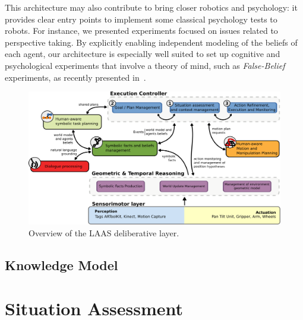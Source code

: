 \documentclass[letterpaper, 10 pt, conference]{ieeeconf}  %
\begin{document}
This architecture may also contribute to bring closer robotics and psychology:
it provides clear entry points to implement some classical psychology tests to
robots. For instance, we presented experiments focused on issues related to
perspective taking. By explicitly enabling independent modeling of the beliefs
of each agent, our architecture is especially well suited to set up cognitive
and psychological experiments that involve a theory of mind, such as
\emph{False-Belief} experiments, as recently presented in~\cite{Warnier2012a}.



\cite{Alami2011}

\begin{figure}
        \centering
        \includegraphics[width=1.7\columnwidth]{archi}
        \caption{Overview of the LAAS deliberative layer.}
        \label{fig|archi}
\end{figure}

\subsection{Knowledge Model}

\cite{Lemaignan2010}

\section{Situation Assessment}
\label{sect|sit-ass}
\end{document}
